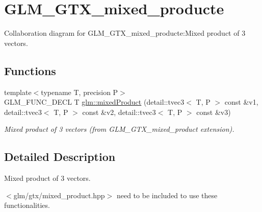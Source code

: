 \hypertarget{group__gtx__mixed__product}{
\section{GLM\_\-GTX\_\-mixed\_\-producte}
\label{group__gtx__mixed__product}
}


Collaboration diagram for GLM\_\-GTX\_\-mixed\_\-producte:Mixed product of 3 vectors.  
\subsection*{Functions}
\begin{CompactItemize}
\item 
\hypertarget{group__gtx__mixed__product_g996c1d98418ba8e1208e273404158883}{
{\footnotesize template$<$typename T, precision P$>$ }\\GLM\_\-FUNC\_\-DECL T \hyperlink{group__gtx__mixed__product_g996c1d98418ba8e1208e273404158883}{glm::mixedProduct} (detail::tvec3$<$ T, P $>$ const \&v1, detail::tvec3$<$ T, P $>$ const \&v2, detail::tvec3$<$ T, P $>$ const \&v3)}
\label{group__gtx__mixed__product_g996c1d98418ba8e1208e273404158883}

\begin{CompactList}\small\item\em Mixed product of 3 vectors (from GLM\_\-GTX\_\-mixed\_\-product extension). \item\end{CompactList}\end{CompactItemize}


\subsection{Detailed Description}
Mixed product of 3 vectors. 

$<$glm/gtx/mixed\_\-product.hpp$>$ need to be included to use these functionalities. 